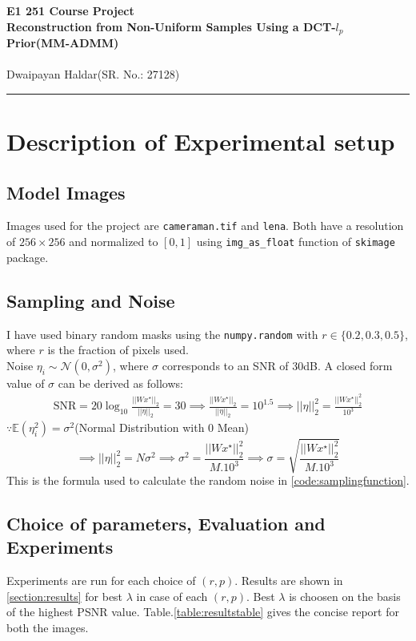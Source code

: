 \documentclass[12pt,a4paper,onecolumn]{exam}
\begin{document}
\renewcommand{\qedsymbol}{$\blacksquare$}
\begingroup
    \centering
    \LARGE \textbf{E1 251 Course Project}\\
    \LARGE \textbf{Reconstruction from Non-Uniform Samples Using a DCT-$l_p$ Prior(MM-ADMM)}\\
    \phantom{123} \\
    \large Dwaipayan Haldar(SR. No.: 27128)\par
\endgroup

\noindent\rule{\textwidth}{0.5pt}

\section{Description of Experimental setup}
\label{section:Experimental Setup}

\subsection{Model Images}
Images used for the project are \verb|cameraman.tif| and \verb|lena|. Both have a resolution of $256 \times 256$ and normalized to $[0,1]$ using \verb|img_as_float| function of \verb|skimage| package.

\subsection{Sampling and Noise}
I have used binary random masks using the \verb|numpy.random| with $r \in \{0.2,0.3,0.5\}$, where $r$ is the fraction of pixels used. \\
Noise $\eta_i \sim \mathcal{N}(0,\sigma^2)$, where $\sigma$ corresponds to an SNR of 30dB. A closed form value of $\sigma$ can be derived as follows:
\[
\begin{aligned}
\text{SNR} = 20\log_{10}\frac{||Wx^\star||_2}{||\eta||_2} = 30
\implies \frac{||Wx^\star||_2}{||\eta||_2} = 10^{1.5} \implies ||\eta||_2^2 = \frac{||Wx^\star||_2^2}{10^{3}}
\end{aligned}
\]
$\because \mathbb{E}(\eta_i^2) = \sigma^2$(Normal Distribution with 0 Mean)
\[
\implies ||\eta||_2^2 = N\sigma^2 \implies \sigma^2 = \frac{||Wx^\star||_2^2}{M.10^{3}} \implies \sigma = \sqrt{\frac{||Wx^\star||_2^2}{M.10^{3}}}
\]
This is the formula used to calculate the random noise in \ref{code:samplingfunction}. 

\subsection{Choice of parameters, Evaluation and Experiments}
Experiments are run for each choice of $(r,p)$. Results are shown in \ref{section:results} for best $\lambda$ in case of each $(r,p)$. Best $\lambda$ is choosen on the basis of the highest PSNR value. Table.\ref{table:resultstable} gives the concise report for both the images.
\end{document}
